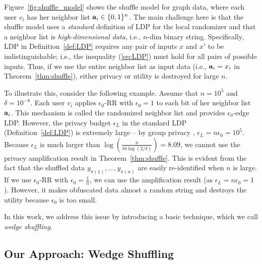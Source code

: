 Figure~\ref{fig:shuffle_model} shows the shuffle model for graph data, where each user $v_i$ has her neighbor list $\mathbf{a}_i \in \{0,1\}^n$. 
The main challenge here 
is that 
the shuffle model uses a \textit{standard} definition of LDP for the local randomizer and that a neighbor list is \textit{high-dimensional data}, i.e., $n$-dim binary string. 
Specifically, LDP in Definition~\ref{def:LDP} requires any pair of inputs $x$ and $x'$ to be indistinguishable; i.e., 
the inequality (\ref{eq:LDP}) must hold for all pairs of possible inputs. 
Thus, if we use the entire neighbor list 
as input data (i.e., $\mathbf{a}_i = x_i$ in Theorem~\ref{thm:shuffle}), 
either privacy or utility is destroyed for large $n$. 

To illustrate this, consider the following example. 
Assume that $n=10^5$ and $\delta=10^{-8}$. 
Each user $v_i$ applies 
$\epsilon_0$-RR 
with $\epsilon_0=1$ to each bit of her neighbor list $\mathbf{a}_i$. 
This mechanism is called the randomized neighbor list \cite{Qin_CCS17} and provides $\epsilon_0$-edge LDP. 
However, the privacy budget $\epsilon_L$ in the standard LDP (Definition~\ref{def:LDP}) 
is extremely large -- by group privacy \cite{DP}, $\epsilon_L = n \epsilon_0 = 10^5$. 
Because 
$\epsilon_L$ 
is much larger than $\log (\frac{n}{16 \log (2/\delta)}) = 8.09$, we cannot use the privacy amplification result in Theorem~\ref{thm:shuffle}. 
This is evident from the fact that the shuffled data $y_{\pi(1)}, \ldots, y_{\pi(n)}$ are easily re-identified when $n$ is large. 
If we use 
$\epsilon_0$-RR 
with $\epsilon_0 = \frac{1}{n}$, we can use the amplification result (as $\epsilon_L = n \epsilon_0 = 1$). 
However, it makes obfuscated data almost a random string and destroys the utility because $\epsilon_0$ is too small. 

In this work, we address this issue by introducing a basic technique, which we call \textit{wedge shuffling}. 

\subsection{Our Approach: Wedge Shuffling}
\label{sub:wedge_shuffle}


